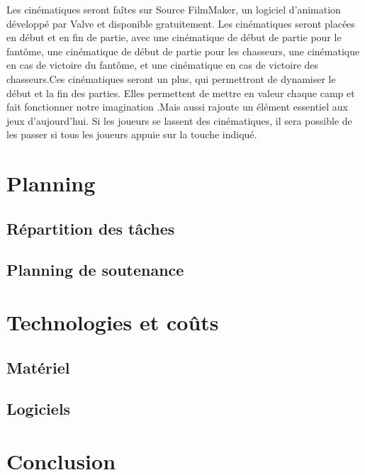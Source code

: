\documentclass[10pt]{article} %
\begin{document}
Les cinématiques seront faîtes sur Source FilmMaker, un logiciel d'animation développé par Valve et disponible gratuitement. Les cinématiques seront placées en début et en fin de partie, avec une cinématique de début de partie pour le fantôme, une cinématique de début de partie pour les chasseurs, une cinématique en cas de victoire du fantôme, et une cinématique en cas de victoire des chasseurs.Ces cinématiques seront un plus, qui permettront de dynamiser le début et la fin des parties. Elles permettent de mettre en valeur chaque camp et fait fonctionner notre imagination .Mais aussi rajoute un élément essentiel aux jeux d'aujourd'hui. Si les joueurs se lassent des cinématiques, il sera possible de les passer si tous les joueurs appuie sur la touche indiqué.    

\section{Planning}



\subsection{Répartition des tâches}



\subsection{Planning de soutenance}



\section{Technologies et coûts}



\subsection{Matériel}



\subsection{Logiciels}



\section{Conclusion}
\end{document}
